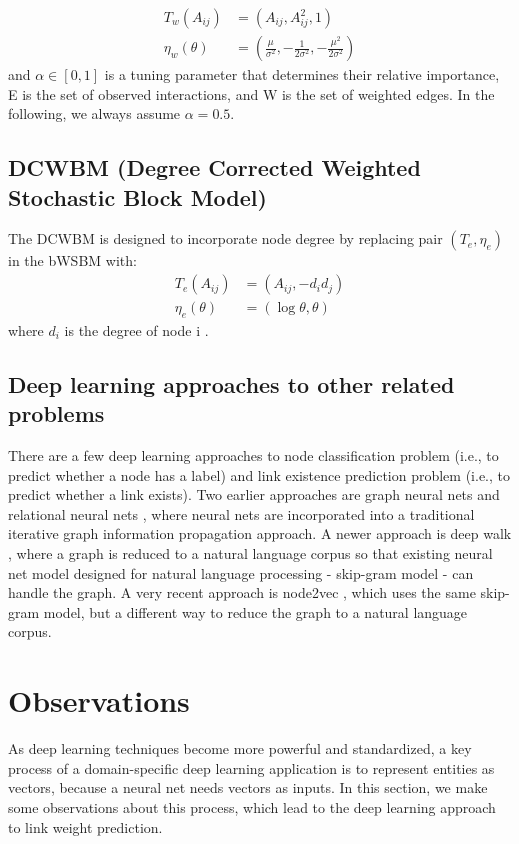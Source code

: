 \documentclass[conference]{IEEEtran}
\begin{document}
\begin{align*}
T_w(A_{ij}) &= (A_{ij}, A_{ij}^2, 1)\\
\eta_w(\theta)
&= (\frac{\mu}{\sigma^2}, -\frac{1}{2\sigma^2}, -\frac{\mu^2}{2\sigma^2})
\end{align*}
and $ \alpha \in [0, 1]$ is a tuning parameter that determines their relative importance,
E is the set of observed interactions,
and W is the set of weighted edges.
In the following, we always assume $ \alpha = 0.5 $.

\subsection{DCWBM (Degree Corrected Weighted Stochastic Block Model)}
The DCWBM is designed to incorporate node degree
by replacing pair $ (T_e, \eta_e) $ in the bWSBM with:
\begin{align*}
	T_e(A_{ij}) &= (A_{ij}, -d_id_j)\\
	\eta_e(\theta) &= (\log\theta, \theta)
\end{align*}
where $ d_i $ is the degree of node i \cite{aicher2014learning}.

\subsection{Deep learning approaches to other related problems}
There are a few deep learning approaches to
node classification problem (i.e., to predict whether a node has a label) and 
link existence prediction problem (i.e., to predict whether a link exists).
Two earlier approaches are graph neural nets and relational neural 
nets \cite{scarselli2009graph},
where neural nets are incorporated into a traditional iterative graph 
information propagation approach.
A newer approach is deep walk \cite{perozzi2014deepwalk}, 
where a graph is reduced to a natural language corpus so that existing neural 
net model designed for natural language processing - skip-gram model - can handle the graph.
A very recent approach is node2vec \cite{grovernode2vec},
which uses the same skip-gram model, 
but a different way to reduce the graph to a natural language corpus.

\section{Observations}
As deep learning techniques become more powerful and standardized,
a key process of a domain-specific deep learning application
is to represent entities as vectors,
because a neural net needs vectors as inputs.
In this section, we make some observations about this process,
which lead to the deep learning approach to link weight prediction.
\end{document}
